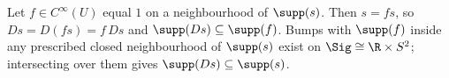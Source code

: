 Let $f \in C^\infty(U)$ equal $1$ on a neighbourhood of $\supp(s)$. Then $s = fs$, so $Ds = D(fs) = f\,Ds$ and $\supp(Ds) \subseteq \supp(f)$. Bumps with $\supp(f)$ inside any prescribed closed neighbourhood of $\supp(s)$ exist on $\Sig \cong \R \times S^2$; intersecting over them gives $\supp(Ds) \subseteq \supp(s)$.

